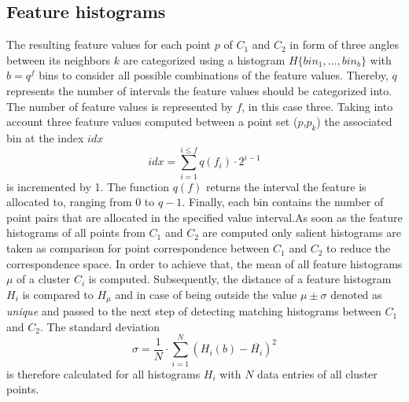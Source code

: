 \subsection{Feature histograms}
\label{histogram}
The resulting feature values for each point $p$ of $C_1$ and $C_2$ in form of three angles between its neighbors $k$ are categorized using a histogram $H \{bin_1,\ldots,bin_b\}$ with $b = q^f$ bins to consider all possible combinations of the feature values. Thereby, $q$ represents the number of intervals the feature values should be categorized into. The number of feature values is represented by $f$, in this case three. Taking into account three feature values computed between a point set ($p$,$p_k$) the associated bin at the index $idx$
\begin{equation}
idx = \displaystyle\sum_{i=1}^{i \leq f}q(f_i) \cdot 2^{i-1}
\end{equation}
is incremented by 1. The function $q(f)$ returns the interval the feature is allocated to, ranging from 0 to $q - 1$. Finally, each bin contains the number of point pairs that are allocated in the specified value interval.As soon as the feature histograms of all points from $C_1$ and $C_2$ are computed only salient histograms are taken as comparison for point correspondence between $C_1$ and $C_2$ to reduce the correspondence space. In order to achieve that, the mean of all feature histograms $\mu$ of a cluster $C_i$ is computed. Subsequently, the distance of a feature histogram $H_i$ is compared to $H_\mu$ and in case of being outside the value $\mu \pm \sigma$ denoted as \textit{unique} and passed to the next step of detecting matching histograms between $C_1$ and $C_2$. The standard deviation
\begin{equation}
\sigma = \frac{1}{N} \cdot \displaystyle\sum_{i=1}^{N}(H_i(b) - \overline{H_i})^2
\end{equation}
is therefore calculated for all histograms $H_i$ with $N$ data entries of all cluster points. 

